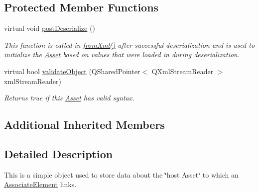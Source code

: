 \subsection*{Protected Member Functions}
\begin{DoxyCompactItemize}
\item 
virtual void \hyperlink{class_picto_1_1_associate_host_link_aa1ca0d868d35551b9d1aa33d234bf439}{post\-Deserialize} ()
\begin{DoxyCompactList}\small\item\em This function is called in \hyperlink{class_picto_1_1_asset_a8bed4da09ecb1c07ce0dab313a9aba67}{from\-Xml()} after successful deserialization and is used to initialize the \hyperlink{class_picto_1_1_asset}{Asset} based on values that were loaded in during deserialization. \end{DoxyCompactList}\item 
virtual bool \hyperlink{class_picto_1_1_associate_host_link_a5369a9879eb508a0fadea06a5f56ce94}{validate\-Object} (Q\-Shared\-Pointer$<$ Q\-Xml\-Stream\-Reader $>$ xml\-Stream\-Reader)
\begin{DoxyCompactList}\small\item\em Returns true if this \hyperlink{class_picto_1_1_asset}{Asset} has valid syntax. \end{DoxyCompactList}\end{DoxyCompactItemize}
\subsection*{Additional Inherited Members}


\subsection{Detailed Description}
This is a simple object used to store data about the \char`\"{}host Asset\char`\"{} to which an \hyperlink{class_picto_1_1_associate_element}{Associate\-Element} links. 

